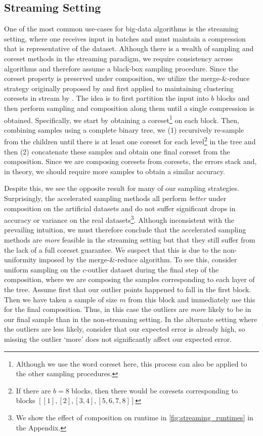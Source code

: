 \subsection{Streaming Setting}
\label{ssec:streaming}

One of the most common use-cases for big-data algorithms is the streaming setting, where one receives input in batches and must maintain a compression that is
representative of the dataset. Although there is a wealth of sampling and coreset methods in the streaming paradigm, we require consistency
across algorithms and therefore assume a black-box sampling procedure. Since the coreset property is preserved under composition, we utilize the merge-\&-reduce
strategy originally proposed by \cite{BS80} and first applied to maintaining clustering coresets in stream by \cite{HaM04}. The idea is to first partition the
input into $b$ blocks and then perform sampling and composition along them until a single compression is obtained. Specifically, we start by obtaining
a coreset\footnote{Although we use the word coreset here, this process can also be applied to the other sampling procedures.} on each block. Then, combining
samples using a complete binary tree, we (1) recursively re-sample from the children until there is at least one coreset for each level\footnote{If there are
$b=8$ blocks, then there would be coresets corresponding to blocks $[[1], [2], [3, 4], [5, 6, 7, 8]]$} in the tree and then (2) concatenate these samples and
obtain one final coreset from the composition. Since we are composing coresets from coresets, the errors stack and, in theory, we should require more samples
to obtain a similar accuracy.

Despite this, we see the opposite result for many of our sampling strategies. Surprisingly, the accelerated sampling methods all perform \emph{better} under
composition on the artificial datasets and do not suffer significant drops in accuracy or variance on the real datasets\footnote{We show the effect of
composition on runtime in \ref{fig:streaming_runtimes} in the Appendix.}. Although inconsistent with the prevailing intuition, we must therefore conclude that
the accelerated sampling methods are \emph{more} feasible in the streaming setting but that they still suffer from the lack of a full coreset guarantee.  We
suspect that this is due to the non-uniformity imposed by the merge-\&-reduce algorithm. To see this, consider uniform sampling on the $c$-outlier dataset
during the final step of the composition, where we are composing the samples corresponding to each layer of the tree. Assume first that our outlier points
happened to fall in the first block. Then we have taken a sample of size $m$ from this block and immediately use this for the final composition. Thus, in this
case the outliers are \emph{more} likely to be in our final sample than in the non-streaming setting. In the alternate setting where the outliers are less
likely, consider that our expected error is already high, so missing the outlier `more' does not significantly affect our expected error. 
